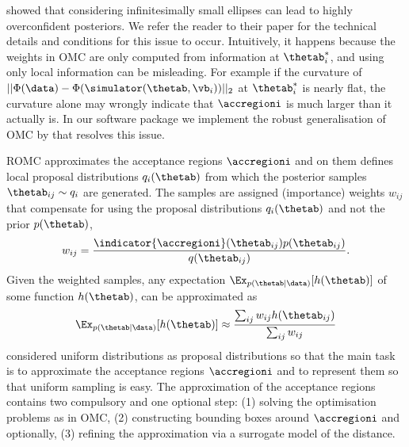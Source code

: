 \citet{Ikonomov2019} showed that considering infinitesimally small
ellipses can lead to highly overconfident posteriors. We refer the
reader to their paper for the technical details and conditions for
this issue to occur. Intuitively, it happens because the weights in
OMC are only computed from information at \(\thetab_i^*\), and using
only local information can be misleading. For example if the curvature
of \(||\Phi(\data)-\Phi(\simulator(\thetab, \vb_i))||_2\) at
\(\thetab_i^*\) is nearly flat, the curvature alone may wrongly
indicate that \(\accregioni\) is much larger than it actually is. In
our software package we implement the robust generalisation of OMC by
\citet{Ikonomov2019} that resolves this issue.

ROMC approximates the acceptance regions \(\accregioni\) and on them defines
local proposal distributions \(q_i(\thetab)\) from which the
posterior samples \(\thetab_{ij} \sim q_i\) are generated. The samples
are assigned (importance) weights \(w_{ij}\) that compensate for using
the proposal distributions \(q_i(\thetab)\) and not the prior
\(p(\thetab)\),
\begin{equation}
  w_{ij} = \frac{\indicator{\accregioni}(\thetab_{ij}) p(\thetab_{ij})}{q(\thetab_{ij})}.
  \label{eq:sampling}
\end{equation}
Given the weighted samples, any expectation
\(\Ex_{p(\thetab|\data)}[h(\thetab)]\) of some function \(h(\thetab)\), can be approximated as
\begin{equation} \label{eq:expectation}
  \Ex_{p(\thetab|\data)}[h(\thetab)] \approx \frac{\sum_{ij} w_{ij} h(\thetab_{ij})}{\sum_{ij} w_{ij}}
\end{equation}
\citet{Ikonomov2019} considered uniform distributions as proposal
distributions so that the main task is to approximate the acceptance
regions \(\accregioni\) and to represent them so that uniform sampling
is easy. The approximation of the acceptance regions contains two
compulsory and one optional step: (1) solving the optimisation
problems as in OMC, (2) constructing bounding boxes around
\(\accregioni\) and optionally, (3) refining the approximation via a
surrogate model of the distance.

